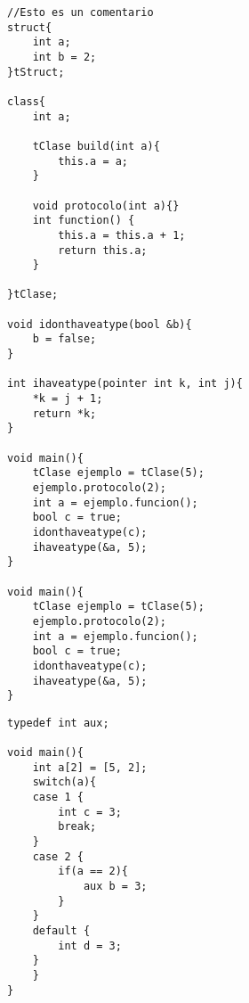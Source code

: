 \documentclass{article}
\begin{document}
\begin{lstlisting}[style=CStyle]
//Esto es un comentario
struct{
    int a;
    int b = 2;
}tStruct;

class{
    int a;

    tClase build(int a){
        this.a = a;
    }

    void protocolo(int a){}
    int function() {
        this.a = this.a + 1;
        return this.a;
    }

}tClase;

void idonthaveatype(bool &b){ 
    b = false;
}

int ihaveatype(pointer int k, int j){
    *k = j + 1;
    return *k;
}

void main(){
    tClase ejemplo = tClase(5);
    ejemplo.protocolo(2);
    int a = ejemplo.funcion();
    bool c = true;
    idonthaveatype(c);
    ihaveatype(&a, 5);
}

void main(){
    tClase ejemplo = tClase(5);
    ejemplo.protocolo(2);
    int a = ejemplo.funcion();
    bool c = true;
    idonthaveatype(c);
    ihaveatype(&a, 5);
}
\end{lstlisting}

\begin{lstlisting}[style=CStyle]
typedef int aux;

void main(){
    int a[2] = [5, 2];
    switch(a){
    case 1 {
        int c = 3;
        break;
    }
    case 2 {
        if(a == 2){
            aux b = 3;
        }
    }
    default {
        int d = 3;
    }
    } 
}
\end{lstlisting}
\end{document}
